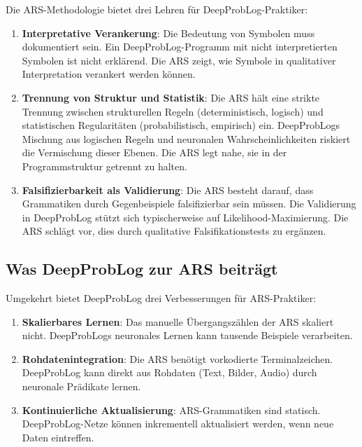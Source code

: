 \documentclass[12pt,a4paper]{article}
\begin{document}
Die ARS-Methodologie bietet drei Lehren für DeepProbLog-Praktiker:

\begin{enumerate}
    \item \textbf{Interpretative Verankerung}: Die Bedeutung von Symbolen muss 
    dokumentiert sein. Ein DeepProbLog-Programm mit nicht interpretierten 
    Symbolen ist nicht erklärend. Die ARS zeigt, wie Symbole in qualitativer 
    Interpretation verankert werden können.
    
    \item \textbf{Trennung von Struktur und Statistik}: Die ARS hält eine 
    strikte Trennung zwischen strukturellen Regeln (deterministisch, logisch) 
    und statistischen Regularitäten (probabilistisch, empirisch) ein. DeepProbLogs 
    Mischung aus logischen Regeln und neuronalen Wahrscheinlichkeiten riskiert 
    die Vermischung dieser Ebenen. Die ARS legt nahe, sie in der Programmstruktur 
    getrennt zu halten.
    
    \item \textbf{Falsifizierbarkeit als Validierung}: Die ARS besteht darauf, 
    dass Grammatiken durch Gegenbeispiele falsifizierbar sein müssen. Die 
    Validierung in DeepProbLog stützt sich typischerweise auf Likelihood-Maximierung. 
    Die ARS schlägt vor, dies durch qualitative Falsifikationstests zu ergänzen.
\end{enumerate}

\subsection{Was DeepProbLog zur ARS beiträgt}

Umgekehrt bietet DeepProbLog drei Verbesserungen für ARS-Praktiker:

\begin{enumerate}
    \item \textbf{Skalierbares Lernen}: Das manuelle Übergangszählen der ARS 
    skaliert nicht. DeepProbLogs neuronales Lernen kann tausende Beispiele 
    verarbeiten.
    
    \item \textbf{Rohdatenintegration}: Die ARS benötigt vorkodierte Terminalzeichen. 
    DeepProbLog kann direkt aus Rohdaten (Text, Bilder, Audio) durch neuronale 
    Prädikate lernen.
    
    \item \textbf{Kontinuierliche Aktualisierung}: ARS-Grammatiken sind statisch. 
    DeepProbLog-Netze können inkrementell aktualisiert werden, wenn neue Daten 
    eintreffen.
\end{enumerate}
\end{document}
